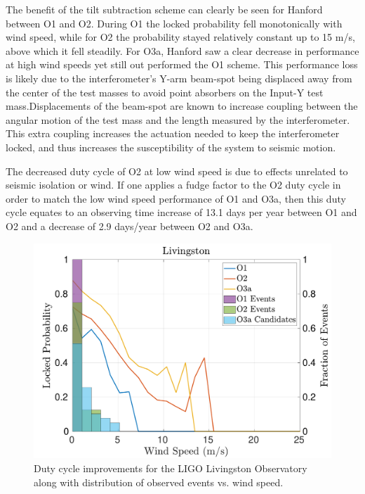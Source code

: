 \documentclass [12pt, proquest]{uwthesis}[2019]
\begin{document}
The benefit of the tilt subtraction scheme can clearly be seen for Hanford between O1 and O2. During O1 the locked probability fell monotonically with wind speed, while for O2 the probability stayed relatively constant up to 15 m/s, above which it fell steadily. For O3a, Hanford saw a clear decrease in performance at high wind speeds yet still out performed the O1 scheme. This performance loss is likely due to the interferometer's Y-arm beam-spot being displaced away from the center of the test masses to avoid point absorbers on the Input-Y test mass.Displacements of the beam-spot are known to increase coupling between the angular motion of the test mass and the length measured by the interferometer. This extra coupling increases the actuation needed to keep the interferometer locked, and thus increases the susceptibility of the system to seismic motion. 

The decreased duty cycle of O2 at low wind speed is due to effects unrelated to seismic isolation or wind. If one applies a fudge factor to the O2 duty cycle in order to match the low wind speed performance of O1 and O3a, then this duty cycle equates to an observing time increase of 13.1 days per year between O1 and O2 and a decrease of 2.9 days/year between O2 and O3a.

\begin{figure}[!h]
\begin{center}
\includegraphics[width=\textwidth]{LLO_WindVsLockEvents.pdf}
\caption[Duty cycle improvements for the LIGO Livingston Observatory]{Duty cycle improvements for the LIGO Livingston Observatory along with distribution of observed events vs. wind speed.}
\label{LLO_events}
\end{center}
\end{figure}
\end{document}
